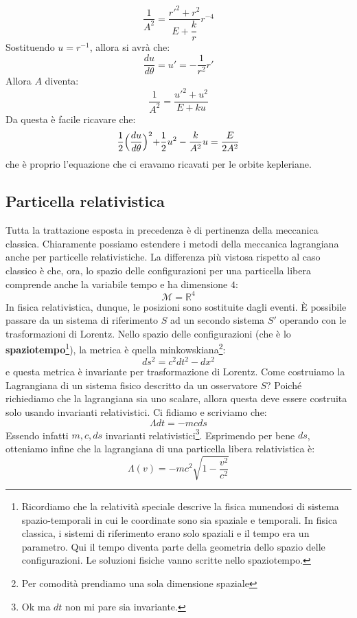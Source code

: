\documentclass[a4paper,openany]{article}
\begin{document}
\begin{equation}\label{key}
	\dfrac{1}{A^2} = \dfrac{r'^2+r^2}{E+\dfrac{k}{r}}r^{-4}
\end{equation}
Sostituendo $u = r^{-1}$, allora si avrà che:
$$
\dfrac{du}{d\theta}=u'=-\dfrac{1}{r^2}r'
$$
Allora $A$ diventa:
\begin{equation}\label{key}
		\dfrac{1}{A^2}  = \dfrac{u'^2 + u^2}{E+ku}
\end{equation}
Da questa è facile ricavare che:
\begin{equation}\label{key}
	\dfrac{1}{2}\Bigl(\dfrac{du}{d\theta}\Bigl)^2+\dfrac{1}{2}u^2-\dfrac{k}{A^2}u=\dfrac{E}{2A^2}
\end{equation}
che è proprio l'equazione che ci eravamo ricavati per le orbite kepleriane. 
\subsection{Particella relativistica}
	Tutta la trattazione esposta in precedenza è di pertinenza della meccanica classica. Chiaramente possiamo estendere i metodi della meccanica lagrangiana anche per particelle relativistiche. La differenza più vistosa rispetto al caso classico è che, ora, lo spazio delle configurazioni per una particella libera comprende anche la variabile tempo e ha dimensione $4$:
	\begin{equation}\label{key}
		\mathcal{M} = \mathbb{R}^4
	\end{equation}
In fisica relativistica, dunque, le posizioni sono sostituite dagli eventi.
	È possibile passare da un sistema di riferimento $S$ ad un secondo sistema $S'$ operando con le trasformazioni di Lorentz. Nello spazio delle configurazioni (che è lo \textbf{spaziotempo}\footnote{Ricordiamo che la relatività speciale descrive la fisica munendosi di sistema spazio-temporali in cui le coordinate sono sia spaziale e temporali. In fisica classica, i sistemi di riferimento erano solo spaziali e il tempo era un parametro. Qui il tempo diventa parte della geometria dello spazio delle configurazioni. Le soluzioni fisiche vanno scritte nello spaziotempo.}), la metrica è quella minkowskiana\footnote{Per comodità prendiamo una sola dimensione spaziale}:
	\begin{equation}\label{key}
		ds^2 = c^2dt^2-dx^2
	\end{equation}
e questa metrica è invariante per trasformazione di Lorentz. Come costruiamo la Lagrangiana di un sistema fisico descritto da un osservatore $S$? Poiché richiediamo che la lagrangiana sia uno scalare, allora questa deve essere costruita solo usando invarianti relativistici. Ci fidiamo e scriviamo che:
\begin{equation}\label{key}
	\Lambda dt = -mcds
\end{equation}
Essendo infatti $m,c,ds$ invarianti relativistici\footnote{Ok ma $dt$ non mi pare sia invariante.}. Esprimendo per bene $ds$, otteniamo infine che la lagrangiana di una particella libera relativistica è:
\begin{equation}\label{key}
	\Lambda(v)= -mc^2\sqrt{1-\dfrac{v^2}{c^2}}
\end{equation}
	\newpage
	
\end{document}

